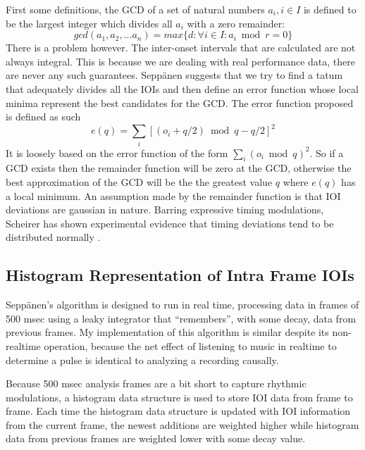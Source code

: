 First some definitions, the GCD of a set of natural numbers $a_i, i
\in I$ is defined to be the largest integer which divides all $a_i$ with a
zero remainder: 
\begin{equation}
gcd(a_1,a_2,...a_n) = max \{d: \forall i \in I: a_i \bmod r = 0 \}
\label{gcd}
\end{equation}
There is a problem however. The inter-onset intervals that are
calculated are not always integral. This is because we are
dealing with real performance data, there are never any such
guarantees. Sepp\"anen suggests that we try to find a tatum that
adequately divides all the IOIs and then define an error function
whose local minima represent the best candidates for the GCD. The
error function proposed is defined as such
\begin{equation}
e(q) =  \sum_{i}[(o_i + q/2) \bmod q - q/2]^2
\label{errorfunc}
\end{equation}
It is loosely based on the error function of the form
$\sum_{i}(o_{i}\bmod q)^2$. So if a GCD exists then the remainder
function will be zero at the GCD, otherwise the best approximation of
the GCD will be the the greatest value $q$ where $e(q)$ has a local minimum.
An assumption made by the remainder function is that IOI deviations
are gaussian in nature. Barring expressive timing modulations,
Scheirer has shown experimental evidence that timing deviations tend to be
distributed normally \cite{Scheirer:98}.

\vspace{5mm}
\subsection{Histogram Representation of Intra Frame IOIs}

Sepp\"anen's algorithm is designed to run in real time, processing data in
frames of 500 msec using a leaky integrator that ``remembers'', with
some decay, data from previous frames.  My implementation of this algorithm
is similar despite its non-realtime operation, because the net effect of listening
to music in realtime to determine a pulse is identical to analyzing a
recording causally.

Because 500 msec analysis frames are a bit short to capture rhythmic modulations, 
a histogram data structure is used to store IOI data from frame to frame.
Each time the histogram data structure is updated with IOI information from
the current frame, the newest additions are weighted higher while
histogram data from previous frames are weighted lower with some decay value. 

